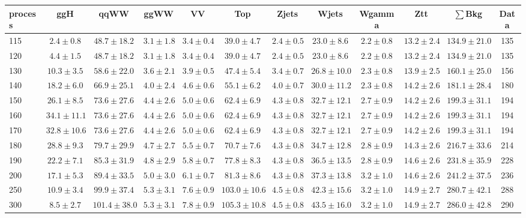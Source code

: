 \begin{table}
{\tiny
 \begin{center}
 \begin{tabular}{l c c c c c c c c c c c }
 \hline
 process & ggH & qqWW & ggWW & VV & Top & Zjets & Wjets & Wgamma & Ztt & $\sum$Bkg & Data \\
 \hline
115 & $2.4\pm0.8$ & $48.7\pm18.2$ & $3.1\pm1.8$ & $3.4\pm0.4$ & $39.0\pm4.7$ & $2.4\pm0.5$ & $23.0\pm8.6$ & $2.2\pm0.8$ & $13.2\pm2.4$ & $134.9\pm21.0$ & 135 \\
120 & $4.4\pm1.5$ & $48.7\pm18.2$ & $3.1\pm1.8$ & $3.4\pm0.4$ & $39.0\pm4.7$ & $2.4\pm0.5$ & $23.0\pm8.6$ & $2.2\pm0.8$ & $13.2\pm2.4$ & $134.9\pm21.0$ & 135 \\
130 & $10.3\pm3.5$ & $58.6\pm22.0$ & $3.6\pm2.1$ & $3.9\pm0.5$ & $47.4\pm5.4$ & $3.4\pm0.7$ & $26.8\pm10.0$ & $2.3\pm0.8$ & $13.9\pm2.5$ & $160.1\pm25.0$ & 156 \\
140 & $18.2\pm6.0$ & $66.9\pm25.1$ & $4.0\pm2.4$ & $4.6\pm0.6$ & $55.1\pm6.2$ & $4.0\pm0.7$ & $30.0\pm11.2$ & $2.3\pm0.8$ & $14.2\pm2.6$ & $181.1\pm28.4$ & 180 \\
150 & $26.1\pm8.5$ & $73.6\pm27.6$ & $4.4\pm2.6$ & $5.0\pm0.6$ & $62.4\pm6.9$ & $4.3\pm0.8$ & $32.7\pm12.1$ & $2.7\pm0.9$ & $14.2\pm2.6$ & $199.3\pm31.1$ & 194 \\
160 & $34.1\pm11.1$ & $73.6\pm27.6$ & $4.4\pm2.6$ & $5.0\pm0.6$ & $62.4\pm6.9$ & $4.3\pm0.8$ & $32.7\pm12.1$ & $2.7\pm0.9$ & $14.2\pm2.6$ & $199.3\pm31.1$ & 194 \\
170 & $32.8\pm10.6$ & $73.6\pm27.6$ & $4.4\pm2.6$ & $5.0\pm0.6$ & $62.4\pm6.9$ & $4.3\pm0.8$ & $32.7\pm12.1$ & $2.7\pm0.9$ & $14.2\pm2.6$ & $199.3\pm31.1$ & 194 \\
180 & $28.8\pm9.3$ & $79.7\pm29.9$ & $4.7\pm2.7$ & $5.5\pm0.7$ & $70.7\pm7.6$ & $4.3\pm0.8$ & $34.7\pm12.8$ & $2.8\pm0.9$ & $14.3\pm2.6$ & $216.7\pm33.6$ & 214 \\
190 & $22.2\pm7.1$ & $85.3\pm31.9$ & $4.8\pm2.9$ & $5.8\pm0.7$ & $77.8\pm8.3$ & $4.3\pm0.8$ & $36.5\pm13.5$ & $2.8\pm0.9$ & $14.6\pm2.6$ & $231.8\pm35.9$ & 228 \\
200 & $17.1\pm5.3$ & $89.4\pm33.5$ & $5.0\pm3.0$ & $6.1\pm0.7$ & $81.3\pm8.6$ & $4.3\pm0.8$ & $37.3\pm13.8$ & $3.2\pm1.0$ & $14.6\pm2.6$ & $241.2\pm37.5$ & 236 \\
250 & $10.9\pm3.4$ & $99.9\pm37.4$ & $5.3\pm3.1$ & $7.6\pm0.9$ & $103.0\pm10.6$ & $4.5\pm0.8$ & $42.3\pm15.6$ & $3.2\pm1.0$ & $14.9\pm2.7$ & $280.7\pm42.1$ & 288 \\
300 & $8.5\pm2.7$ & $101.4\pm38.0$ & $5.3\pm3.1$ & $7.8\pm0.9$ & $105.3\pm10.8$ & $4.5\pm0.8$ & $43.5\pm16.0$ & $3.2\pm1.0$ & $14.9\pm2.7$ & $286.0\pm42.8$ & 290 \\

\end{tabular}
\end{center}}
\end{table}
